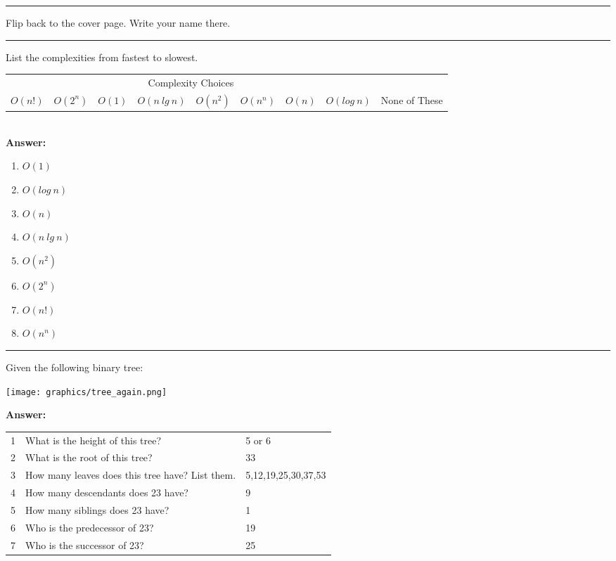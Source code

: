 \documentclass[12pt]{exam}
\newcommand{\ans}[1]{\textcolor{dgreen}{#1}}
\newcommand{\ansbox}[1]{
\textcolor{dgreen}{\textbf{Answer:}}\\
\noindent\colorbox[gray]{0.90}{%
    \parbox{\textwidth - 12 \fboxsep}{\ans{#1}}%
}}
\newcommand{\seperate}{\begin{center}\noindent\rule{18cm}{0.75pt}\end{center}}
\begin{document}
\noindent
\rule[2ex]{\textwidth}{2pt}
\clearpage



\begin{questions}

    \question[5]Flip back to the cover page. Write your name there.

    \seperate

    \question[20]List the complexities from fastest to slowest.

    \begin{tabular}{ c  c  c  c  c  c  c  c c }
        \multicolumn{8}{c}{Complexity Choices} \\
        $O(n!)$ & $O(2^n)$ & $O(1)$ & $O(n\ lg\ n)$ & $O(n^2)$ & $O(n^n)$ & $O(n)$ & $O(log\ n)$ & None of These \\
    \end{tabular}\\


    \ansbox{
        \begin{enumerate}
            \item $O(1)$
            \item $O(log\ n)$
            \item $O(n)$
            \item $O(n\ lg\ n)$
            \item $O(n^2)$
            \item $O(2^n)$
            \item $O(n!)$
            \item $O(n^n)$
        \end{enumerate}
    }




    \seperate

    \question[20] Given the following binary tree:

    \texttt{[image: graphics/tree\_again.png]}

    \ansbox{
    \begin{tabular}{ c  l  l}
        1 & What is the height of this tree?                & 5 or 6              \\
        2 & What is the root of this tree?                  & 33                  \\
        3 & How many leaves does this tree have? List them. & 5,12,19,25,30,37,53 \\
        4 & How many descendants does 23 have?              & 9                   \\
        5 & How many siblings does 23 have?                 & 1                   \\
        6 & Who is the predecessor of 23?                   & 19                  \\
        7 & Who is the successor of 23?                     & 25                  \\
    \end{tabular}
    }


\end{questions}
\end{document}
